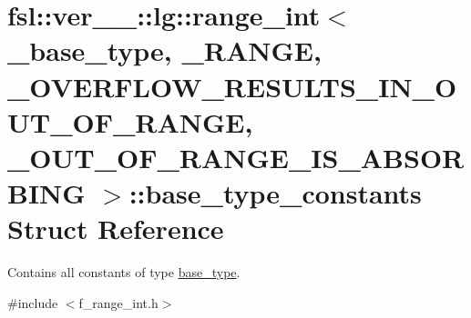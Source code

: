 \hypertarget{structfsl_1_1ver__1__0_1_1lg_1_1range__int_1_1base__type__constants}{}\section{fsl\+::ver\+\_\+\_\+::lg\+::range\+\_\+int$<$ \+\_\+base\+\_\+type, \+\_\+\+R\+A\+N\+GE, \+\_\+\+O\+V\+E\+R\+F\+L\+O\+W\+\_\+\+R\+E\+S\+U\+L\+T\+S\+\_\+\+I\+N\+\_\+\+O\+U\+T\+\_\+\+O\+F\+\_\+\+R\+A\+N\+GE, \+\_\+\+O\+U\+T\+\_\+\+O\+F\+\_\+\+R\+A\+N\+G\+E\+\_\+\+I\+S\+\_\+\+A\+B\+S\+O\+R\+B\+I\+NG $>$\+::base\+\_\+type\+\_\+constants Struct Reference}
\label{structfsl_1_1ver__1__0_1_1lg_1_1range__int_1_1base__type__constants}


Contains all constants of type \mbox{\hyperlink{classfsl_1_1ver__1__0_1_1lg_1_1range__int_aa6c763f6d72d18c8b9129c0c06628cd3}{base\+\_\+type}}.  




{\ttfamily \#include $<$f\+\_\+range\+\_\+int.\+h$>$}

